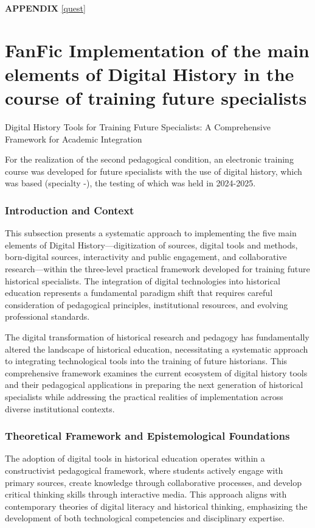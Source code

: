 \textbf{APPENDIX} \ref{quest}



\section{FanFic Implementation of the main elements of Digital History in the course of training future specialists}
  Digital History Tools for Training Future Specialists: A Comprehensive Framework for Academic Integration

For the realization of the second pedagogical condition, an electronic training course was developed for future specialists with the use of digital history, which was based (specialty -), the testing of which was held in 2024-2025.


\subsubsection {Introduction and Context}

This subsection presents a systematic approach to implementing the five main elements of Digital History—digitization of sources, digital tools and methods, born-digital sources, interactivity and public engagement, and collaborative research—within the three-level practical framework developed for training future historical specialists. The integration of digital technologies into historical education represents a fundamental paradigm shift that requires careful consideration of pedagogical principles, institutional resources, and evolving professional standards.

The digital transformation of historical research and pedagogy has fundamentally altered the landscape of historical education, necessitating a systematic approach to integrating technological tools into the training of future historians. This comprehensive framework examines the current ecosystem of digital history tools and their pedagogical applications in preparing the next generation of historical specialists while addressing the practical realities of implementation across diverse institutional contexts.

\subsubsection {Theoretical Framework and Epistemological Foundations}

The adoption of digital tools in historical education operates within a constructivist pedagogical framework, where students actively engage with primary sources, create knowledge through collaborative processes, and develop critical thinking skills through interactive media. This approach aligns with contemporary theories of digital literacy and historical thinking, emphasizing the development of both technological competencies and disciplinary expertise.

